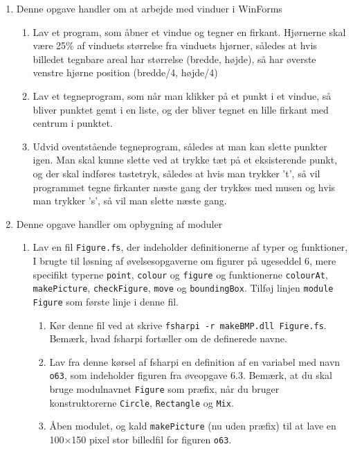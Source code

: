 \documentclass[a4paper]{article}
\begin{document}
\begin{enumerate}[ø1.]
\item Denne opgave handler om at arbejde med vinduer i WinForms
  \begin{enumerate}
  \item Lav et program, som åbner et vindue og tegner en
    firkant. Hjørnerne skal være 25\% af vinduets størrelse fra
    vinduets hjørner, således at hvis billedet tegnbare areal har
    størrelse (bredde, højde), så har øverste venstre hjørne position
    (bredde/4, højde/4)
  \item Lav et tegneprogram, som når man klikker på et punkt i et
    vindue, så bliver punktet gemt i en liste, og der bliver tegnet en
    lille firkant med centrum i punktet.
  \item Udvid oventstående tegneprogram, således at man kan slette
    punkter igen. Man skal kunne slette ved at trykke tæt på et
    eksisterende punkt, og der skal indføres tastetryk, således at hvis
    man trykker 't', så vil programmet tegne firkanter næste gang der
    trykkes med musen og hvis man trykker 's', så vil man slette næste gang.
  \end{enumerate}

  \item Denne opgave handler om opbygning af moduler
    \begin{enumerate}
    \item Lav en fil \texttt{Figure.fs}, der indeholder definitionerne af typer og funktioner, I brugte til løsning af øvelsesopgaverne om figurer på ugeseddel 6, mere specifikt typerne \texttt{point}, \texttt{colour} og \texttt{figure} og funktionerne \texttt{colourAt}, \texttt{makePicture}, \texttt{checkFigure}, \texttt{move} og \texttt{boundingBox}.  Tilføj linjen \texttt{module Figure} som første linje i denne fil.
    \begin{enumerate}
    \item Kør denne fil ved at skrive \texttt{fsharpi -r makeBMP.dll Figure.fs}.  Bemærk, hvad fsharpi fortæller om de definerede navne.

    \item Lav fra denne kørsel af fsharpi en definition af en variabel med navn \texttt{o63}, som indeholder figuren fra øveopgave 6.3.  Bemærk, at du skal bruge modulnavnet \texttt{Figure} som præfix, når du bruger konstruktorerne \texttt{Circle}, \texttt{Rectangle} og \texttt{Mix}.

    \item Åben modulet, og kald \texttt{makePicture} (nu uden præfix) til at lave en 100×150 pixel stor billedfil for figuren \texttt{o63}.
    \end{enumerate}


\end{enumerate}
\end{enumerate}
\end{document}
